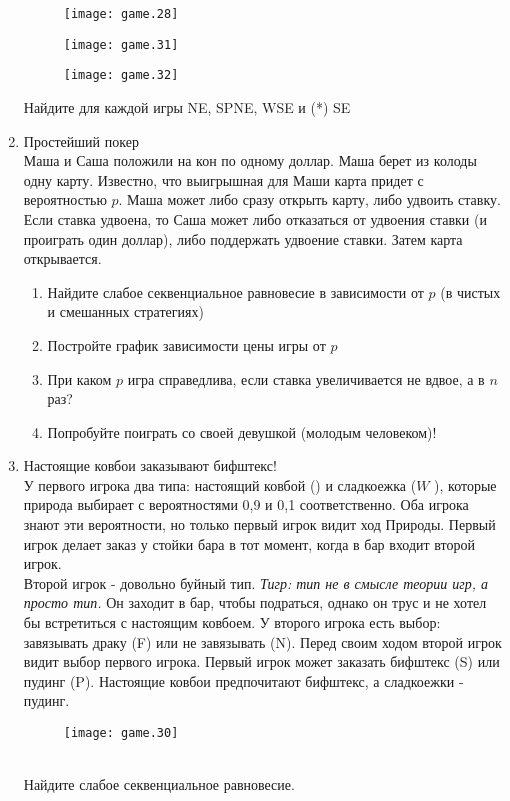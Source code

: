 \documentclass[pdftex,12pt,a4paper]{article}
\begin{document}
\begin{enumerate}
\begin{figure}[!htbp]
    \texttt{[image: game.28]}
\end{figure} 


\begin{figure}[!htbp]
    \texttt{[image: game.31]}
\end{figure} 


\begin{figure}[!htbp]
    \texttt{[image: game.32]}
\end{figure} 

Найдите для каждой игры NE, SPNE, WSE и (*) SE 

\item Простейший покер \\
Маша и Саша положили на кон по одному доллар. Маша берет из колоды одну карту. Известно, что выигрышная для Маши карта придет с вероятностью $p$. Маша может либо сразу открыть карту, либо удвоить ставку. Если ставка удвоена, то Саша может либо отказаться от удвоения ставки (и проиграть один доллар), либо поддержать удвоение ставки. Затем карта открывается.
\begin{enumerate}
\item Найдите слабое секвенциальное равновесие в зависимости от $p$ (в чистых и смешанных стратегиях) 
\item Постройте график зависимости цены игры от $p$
\item При каком $p$ игра справедлива, если ставка увеличивается не вдвое, а в $n$  раз?
\item Попробуйте поиграть со своей девушкой (молодым человеком)!
\end{enumerate}

\item Настоящие ковбои заказывают бифштекс!\\
У первого игрока два типа: настоящий ковбой () и сладкоежка ($W$
), которые природа выбирает с вероятностями 0,9 и 0,1 соответственно. Оба игрока знают эти вероятности, но только первый игрок видит ход Природы. Первый игрок делает заказ у стойки бара в тот момент, когда в бар входит второй игрок.\\
Второй игрок - довольно буйный тип. \textit{Тигр: тип не в смысле теории игр, а просто тип.} Он заходит в бар, чтобы подраться, однако он трус и не хотел бы встретиться с настоящим ковбоем. У второго игрока есть выбор: завязывать драку (F) или не завязывать (N). Перед своим ходом второй игрок видит выбор первого игрока. 
Первый игрок может заказать бифштекс (S) или пудинг (P). Настоящие ковбои предпочитают бифштекс, а сладкоежки - пудинг.\\
\begin{figure}[htbp]
    \texttt{[image: game.30]}
\end{figure} \\
Найдите слабое секвенциальное равновесие.


\end{enumerate}
\end{document}

